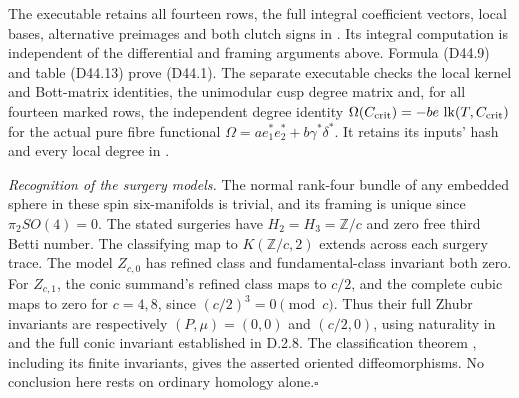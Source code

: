 The executable
retains all fourteen rows, the full integral coefficient
vectors, local bases, alternative preimages and both clutch
signs in
.
Its integral computation is independent of the differential
and framing arguments above. Formula (D44.9) and table
(D44.13) prove (D44.1).
The separate executable
checks the local kernel and Bott-matrix identities, the
unimodular cusp degree matrix and, for all fourteen marked
rows, the independent degree identity
$\Omega(C_{\rm crit})=-be\,\operatorname{lk}(T,C_{\rm crit})$
for the actual pure fibre functional
$\Omega=a e_1^*e_2^*+b\gamma^*\delta^*$.
It retains its inputs' hash and every local degree in
.

\emph{Recognition of the surgery models.}
The normal rank-four bundle of any embedded sphere in these
spin six-manifolds is trivial, and its framing is unique
since $\pi_2SO(4)=0$. The stated surgeries have $H_2=H_3=\mathbb Z/c$
and zero free third Betti number. The classifying map to
$K(\mathbb Z/c,2)$ extends across each surgery trace.
The model $Z_{c,0}$ has refined class and fundamental-class
invariant both zero. For $Z_{c,1}$, the conic summand's refined
class maps to $c/2$, and the complete cubic maps to zero for
$c=4,8$, since $(c/2)^3=0\pmod c$. Thus their full Zhubr
invariants are respectively $(P,\mu)=(0,0)$ and $(c/2,0)$,
using naturality in \cite[Theorem 5]{manZhubr75} and the full
conic invariant established in D.2.8.
The classification theorem \cite[Theorem 3]{manZhubr75}, including
its finite invariants, gives the asserted oriented diffeomorphisms. No conclusion
here rests on ordinary homology alone.\hfill$\square$
